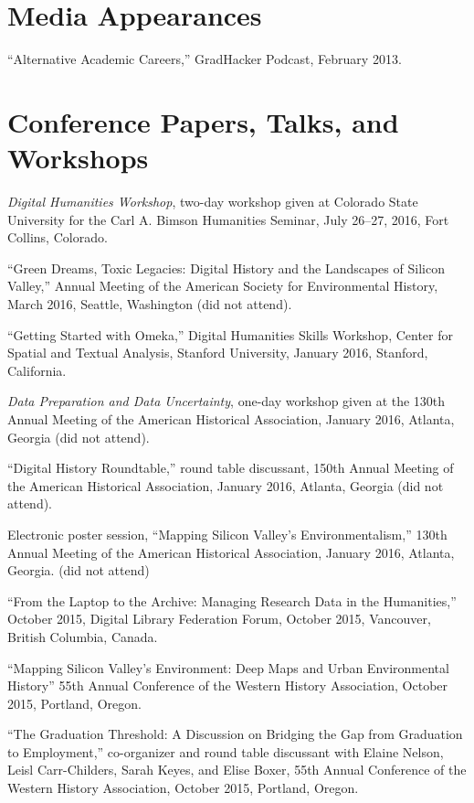 \section{Media Appearances}\label{media-appearances}

``Alternative Academic Careers,'' GradHacker Podcast, February 2013.

\section{Conference Papers, Talks, and
Workshops}\label{conference-papers-talks-and-workshops}

\emph{Digital Humanities Workshop}, two-day workshop given at Colorado
State University for the Carl A. Bimson Humanities Seminar, July 26--27,
2016, Fort Collins, Colorado.

``Green Dreams, Toxic Legacies: Digital History and the Landscapes of
Silicon Valley,'' Annual Meeting of the American Society for
Environmental History, March 2016, Seattle, Washington (did not attend).

``Getting Started with Omeka,'' Digital Humanities Skills Workshop,
Center for Spatial and Textual Analysis, Stanford University, January
2016, Stanford, California.

\emph{Data Preparation and Data Uncertainty}, one-day workshop given at
the 130th Annual Meeting of the American Historical Association, January
2016, Atlanta, Georgia (did not attend).

``Digital History Roundtable,'' round table discussant, 150th Annual
Meeting of the American Historical Association, January 2016, Atlanta,
Georgia (did not attend).

Electronic poster session, ``Mapping Silicon Valley's
Environmentalism,'' 130th Annual Meeting of the American Historical
Association, January 2016, Atlanta, Georgia. (did not attend)

``From the Laptop to the Archive: Managing Research Data in the
Humanities,'' October 2015, Digital Library Federation Forum, October
2015, Vancouver, British Columbia, Canada.

``Mapping Silicon Valley's Environment: Deep Maps and Urban
Environmental History'' 55th Annual Conference of the Western History
Association, October 2015, Portland, Oregon.

``The Graduation Threshold: A Discussion on Bridging the Gap from
Graduation to Employment,'' co-organizer and round table discussant with
Elaine Nelson, Leisl Carr-Childers, Sarah Keyes, and Elise Boxer, 55th
Annual Conference of the Western History Association, October 2015,
Portland, Oregon.

